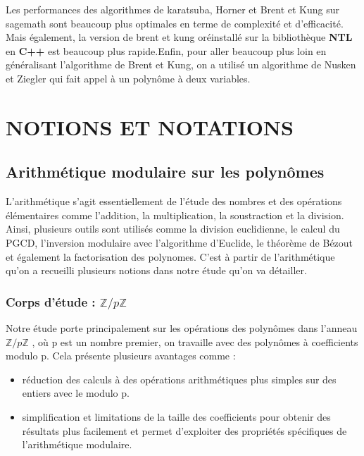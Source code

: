 \documentclass[a4paper]{article}
\begin{document}
Les performances des algorithmes de karatsuba, Horner et Brent et Kung sur sagemath sont beaucoup plus optimales en terme de complexité et d'efficacité. Mais également, la version de brent et kung oréinstallé sur la bibliothèque \textbf{NTL} en \textbf{C++} est beaucoup plus rapide.Enfin, pour aller beaucoup plus loin en généralisant l'algorithme de Brent et Kung, on a utilisé un algorithme de Nusken et Ziegler qui fait appel à un polynôme à deux variables.  


\section{NOTIONS ET NOTATIONS}

\subsection{Arithmétique modulaire sur les polynômes}

L'arithmétique s'agit essentiellement de l'étude des nombres et des opérations élémentaires comme l'addition, la multiplication, la soustraction et la division. Ainsi, plusieurs outils sont utilisés comme la division euclidienne, le calcul du PGCD, l'inversion modulaire avec l'algorithme d'Euclide, le théorème de Bézout et également la factorisation des polynomes. C'est à partir de l'arithmétique qu'on a recueilli plusieurs notions dans notre étude qu'on va détailler.

 \subsubsection{Corps d'étude : ${\mathbb{Z}/p \mathbb{Z}}$}
 
Notre étude porte principalement sur les opérations des polynômes dans l'anneau ${\mathbb{Z}/p \mathbb{Z}}$ , où p est un nombre premier, on travaille avec des polynômes à coefficients modulo p. Cela présente plusieurs avantages comme :
	\begin{itemize}

  		\item réduction des calculs à des opérations arithmétiques plus simples sur des entiers avec le modulo p.
  		\item simplification et limitations de la taille des coefficients pour obtenir des résultats plus facilement et permet d'exploiter des propriétés spécifiques de l'arithmétique modulaire.
  
	\end{itemize}
	
\end{document}
